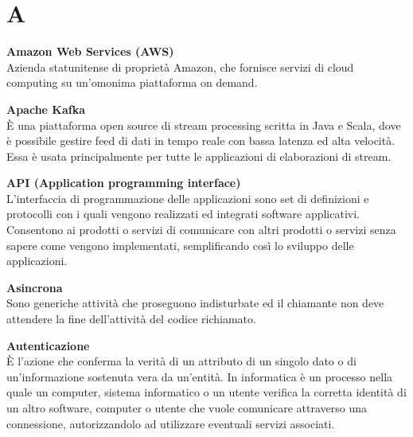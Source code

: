 \section{A}
\textbf{Amazon Web Services (AWS)}\\
Azienda statunitense di proprietà Amazon, che fornisce servizi di cloud computing su un'omonima piattaforma on demand.

\textbf{Apache Kafka}\\
È una piattaforma open source di stream processing scritta in Java e Scala, dove è possibile gestire feed di dati in tempo reale con bassa latenza ed alta velocità. Essa è usata principalmente per tutte le applicazioni di elaborazioni di stream. 

\textbf{API (Application programming interface)}\\
L'interfaccia di programmazione delle applicazioni sono set di definizioni e protocolli con i quali vengono realizzati ed integrati software applicativi. Consentono ai  prodotti o servizi di comunicare con altri prodotti o servizi senza sapere come vengono implementati, semplificando così lo sviluppo delle applicazioni.

\textbf{Asincrona}\\
Sono generiche attività che proseguono indisturbate ed il chiamante non deve attendere la fine dell'attività del codice richiamato.

\textbf{Autenticazione}\\
È l’azione che conferma la verità di un attributo di un singolo dato o di un’informazione sostenuta vera da un’entità. In informatica è un processo nella quale un computer, sistema informatico o un utente verifica la corretta identità di un altro software, computer o utente che vuole comunicare attraverso una connessione, autorizzandolo  ad utilizzare eventuali servizi associati.

\clearpage